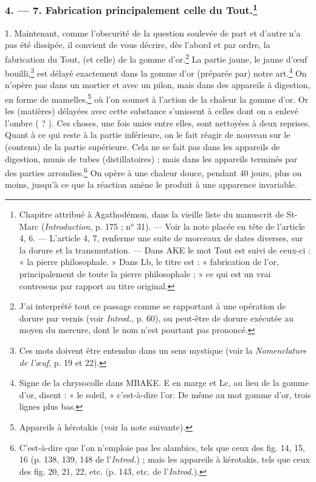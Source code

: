 \documentclass[a4paper, 11pt, oneside, polutonikogreek, french]{article}
\begin{document}
\bigskip
\centerline{\EightStarTaper}
\centerline{\EightStarTaper\EightStarTaper}
\bigskip

\subsubsection[4. --- 7. Fabrication principalement celle du Tout.]{4. --- 7. Fabrication principalement celle du Tout.\footnote{Chapitre attribué à Agathodémon, dans la vieille liste du manuscrit de St-Marc (\emph{Introduction}, p. 175 ; n° 31). --- Voir la note placée en tête de l'article 4, 6. --- L'article 4, 7, renferme une suite de morceaux de dates diverses, sur la dorure et la transmutation. --- Dans AKE le mot Tout est suivi de ceux-ci : « la pierre philosophale. » Dans Lb, le titre est : « fabrication de l'or, principalement de toute la pierre philosophale ; » ce qui est un vrai contresens par rapport au titre original.}}

1. Maintenant, comme l'obscurité de la question soulevée de part et d'autre n'a pas été dissipée, il convient de vous décrire, dès l'abord et par ordre, la fabrication du Tout, (et celle) de la gomme d'or.\footnote{J'ai interprété tout ce passage comme se rapportant à une opération de dorure par vernis (voir \emph{Introd.}, p. 60), ou peut-être de dorure exécutée au moyen du mercure, dont le nom n'est pourtant pas prononcé.} La partie jaune, le jaune d'œuf bouilli,\footnote{Ces mots doivent être entendus dans un sens mystique (voir la \emph{Nomenclature de l'œuf}, p. 19 et 22).} est délayé exactement dans la gomme d'or (préparée par) notre art.\footnote{Signe de la chrysocolle dans MBAKE. E en marge et Lc, au lieu de la gomme d'or, disent : « le soleil, » c'est-à-dire l'or. De même au mot gomme d'or, trois lignes plus bas.} On n'opère pas dans un mortier et avec un pilon, mais dans des appareils à digestion, en forme de mamelles,\footnote{Appareils à kérotakis (voir la note suivante).} où l'on soumet à l'action de la chaleur la gomme d'or. Or les (matières) délayées avec cette substance s'unissent à celles dont on a enlevé l'ombre ( ? ). Ces choses, une fois unies entre elles, sont nettoyées à deux reprises. Quant à ce qui reste à la partie inférieure, on le fait réagir de nouveau sur le (contenu) de la partie supérieure. Cela ne se fait pas dans les appareils de digestion, munis de tubes (distillatoires) ; mais dans les appareils terminés par des parties arrondies.\footnote{C'est-à-dire que l'on n'emploie pas les alambics, tels que ceux des fig. 14, 15, 16 (p. 138, 139, 148 de l'\emph{Introd.}) ; mais les appareils à kérotakis, tels que ceux des fig. 20, 21, 22, etc. (p. 143, etc. de l'\emph{Introd.}).} On opère à une chaleur douce, pendant 40 jours, plus ou moins, jusqu'à ce que la réaction amène le produit à une apparence invariable.
\end{document}
